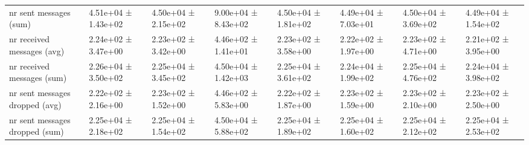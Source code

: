 \begin{tabular}{llllllll}
 nr sent messages (sum)             & 4.51e+04 ± 1.43e+02 & 4.50e+04 ± 2.15e+02 & 9.00e+04 ± 8.43e+02   & 4.50e+04 ± 1.81e+02 & 4.49e+04 ± 7.03e+01 & 4.50e+04 ± 3.69e+02 & 4.49e+04 ± 1.54e+02   \\
 nr received messages (avg)         & 2.24e+02 ± 3.47e+00 & 2.23e+02 ± 3.42e+00 & 4.46e+02 ± 1.41e+01   & 2.23e+02 ± 3.58e+00 & 2.22e+02 ± 1.97e+00 & 2.23e+02 ± 4.71e+00 & 2.21e+02 ± 3.95e+00   \\
 nr received messages (sum)         & 2.26e+04 ± 3.50e+02 & 2.25e+04 ± 3.45e+02 & 4.50e+04 ± 1.42e+03   & 2.25e+04 ± 3.61e+02 & 2.24e+04 ± 1.99e+02 & 2.25e+04 ± 4.76e+02 & 2.24e+04 ± 3.98e+02   \\
 nr sent messages dropped (avg)     & 2.22e+02 ± 2.16e+00 & 2.23e+02 ± 1.52e+00 & 4.46e+02 ± 5.83e+00   & 2.22e+02 ± 1.87e+00 & 2.23e+02 ± 1.59e+00 & 2.23e+02 ± 2.10e+00 & 2.23e+02 ± 2.50e+00   \\
 nr sent messages dropped (sum)     & 2.25e+04 ± 2.18e+02 & 2.25e+04 ± 1.54e+02 & 4.50e+04 ± 5.88e+02   & 2.25e+04 ± 1.89e+02 & 2.25e+04 ± 1.60e+02 & 2.25e+04 ± 2.12e+02 & 2.25e+04 ± 2.53e+02   \\
\hline
\end{tabular}